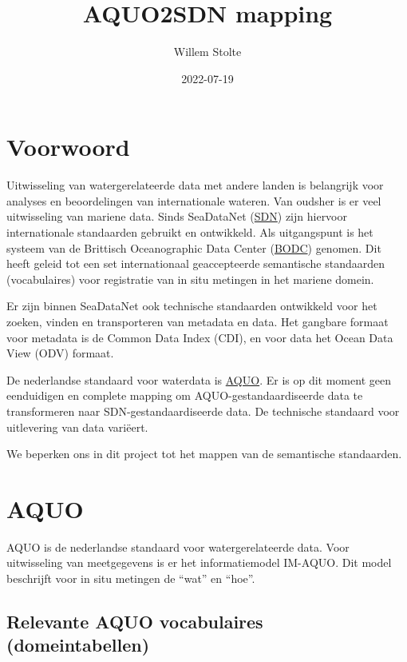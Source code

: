 \documentclass[
]{book}
\title{AQUO2SDN mapping}
\author{Willem Stolte}
\date{2022-07-19}
\begin{document}
\maketitle

{
\setcounter{tocdepth}{1}
\tableofcontents
}
\hypertarget{voorwoord}{%
\chapter{Voorwoord}\label{voorwoord}}

Uitwisseling van watergerelateerde data met andere landen is belangrijk voor analyses en beoordelingen van internationale wateren. Van oudsher is er veel uitwisseling van mariene data. Sinds SeaDataNet (\href{https://www.seadatanet.org/}{SDN}) zijn hiervoor internationale standaarden gebruikt en ontwikkeld. Als uitgangspunt is het systeem van de Brittisch Oceanographic Data Center (\href{https://www.bodc.ac.uk/}{BODC}) genomen. Dit heeft geleid tot een set internationaal geaccepteerde semantische standaarden (vocabulaires) voor registratie van in situ metingen in het mariene domein.

Er zijn binnen SeaDataNet ook technische standaarden ontwikkeld voor het zoeken, vinden en transporteren van metadata en data. Het gangbare formaat voor metadata is de Common Data Index (CDI), en voor data het Ocean Data View (ODV) formaat.

De nederlandse standaard voor waterdata is \href{https://www.aquo.nl/index.php/Hoofdpagina}{AQUO}. Er is op dit moment geen eenduidigen en complete mapping om AQUO-gestandaardiseerde data te transformeren naar SDN-gestandaardiseerde data. De technische standaard voor uitlevering van data variëert.

We beperken ons in dit project tot het mappen van de semantische standaarden.

\hypertarget{aquo}{%
\chapter{AQUO}\label{aquo}}

AQUO is de nederlandse standaard voor watergerelateerde data. Voor uitwisseling van meetgegevens is er het informatiemodel IM-AQUO. Dit model beschrijft voor in situ metingen de ``wat'' en ``hoe''.

\hypertarget{relevante-aquo-vocabulaires-domeintabellen}{%
\section{Relevante AQUO vocabulaires (domeintabellen)}\label{relevante-aquo-vocabulaires-domeintabellen}}
\end{document}
